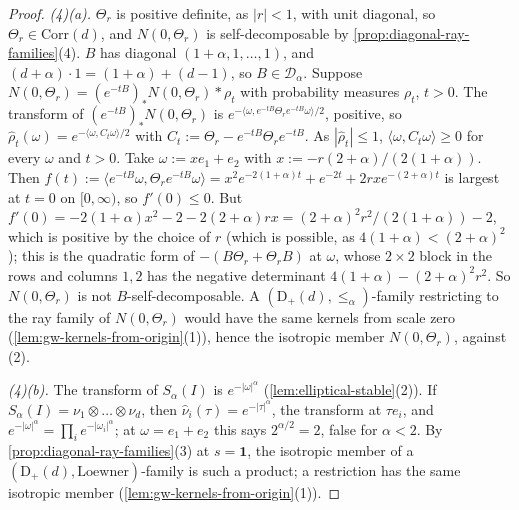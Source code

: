 \begin{proof}
\emph{(4)(a).} $\Theta_r$ is positive definite, as $|r| < 1$, with unit diagonal, so $\Theta_r \in \mathrm{Corr}(d)$,
and $N(0, \Theta_r)$ is self-decomposable by \ref{prop:diagonal-ray-families}(4). $B$ has diagonal
$(1+\alpha, 1, \dots, 1)$, and $(d+\alpha)\cdot 1 = (1 + \alpha) + (d - 1)$, so $B \in \mathcal D_\alpha$.
Suppose $N(0, \Theta_r) = (e^{-tB})_*N(0, \Theta_r) * \rho_t$ with probability measures $\rho_t$, $t > 0$. The
transform of $(e^{-tB})_*N(0, \Theta_r)$ is $e^{-\langle\omega,e^{-tB}\Theta_re^{-tB}\omega\rangle/2}$, positive, so
$\widehat\rho_t(\omega) = e^{-\langle\omega,C_t\omega\rangle/2}$ with $C_t := \Theta_r - e^{-tB}\Theta_re^{-tB}$. As
$|\widehat\rho_t| \le 1$, $\langle\omega,C_t\omega\rangle \ge 0$ for every $\omega$ and $t > 0$.
Take $\omega := xe_1 + e_2$ with $x := -r(2+\alpha)/(2(1+\alpha))$. Then
$f(t) := \langle e^{-tB}\omega, \Theta_r e^{-tB}\omega\rangle = x^2e^{-2(1+\alpha)t} + e^{-2t} + 2rxe^{-(2+\alpha)t}$
is largest at $t = 0$ on $[0, \infty)$, so $f'(0) \le 0$. But
$f'(0) = -2(1+\alpha)x^2 - 2 - 2(2+\alpha)rx = (2+\alpha)^2r^2/(2(1+\alpha)) - 2$, which is positive by the
choice of $r$ (which is possible, as $4(1+\alpha) < (2+\alpha)^2$); this is the quadratic form of
$-(B\Theta_r + \Theta_rB)$ at $\omega$, whose $2 \times 2$ block in the rows and columns $1, 2$ has the negative
determinant $4(1+\alpha) - (2+\alpha)^2r^2$. So $N(0, \Theta_r)$ is not $B$-self-decomposable. A
$(\mathrm D_+(d), \le_\alpha)$-family restricting to the ray family of $N(0, \Theta_r)$ would have the same
kernels from scale zero (\ref{lem:gw-kernels-from-origin}(1)), hence the isotropic member $N(0, \Theta_r)$,
against (2).

\emph{(4)(b).} The transform of $S_\alpha(I)$ is $e^{-|\omega|^\alpha}$ (\ref{lem:elliptical-stable}(2)). If
$S_\alpha(I) = \nu_1 \otimes \dots \otimes \nu_d$, then $\widehat\nu_i(\tau) = e^{-|\tau|^\alpha}$, the transform at
$\tau e_i$, and $e^{-|\omega|^\alpha} = \prod_ie^{-|\omega_i|^\alpha}$; at $\omega = e_1 + e_2$ this says
$2^{\alpha/2} = 2$, false for $\alpha < 2$. By \ref{prop:diagonal-ray-families}(3) at $s = \mathbf 1$, the
isotropic member of a $(\mathrm D_+(d), \text{Loewner})$-family is such a product; a restriction has the
same isotropic member (\ref{lem:gw-kernels-from-origin}(1)).


\end{proof}
